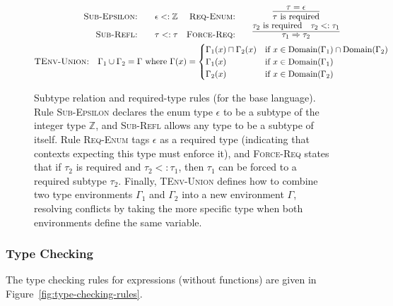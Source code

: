 \documentclass[peerreview, 10pt]{IEEEtran}
\newcommand{\Z}{\ensuremath{\mathbb{Z}}}
\newcommand{\required}[1]{\ensuremath{#1\text{ is required}}}
\newcommand{\forcerequire}[2]{\ensuremath{#1\Rightarrow#2}}
\begin{document}
\begin{figure}[ht]
\centering
\begin{framed}
    \[
\begin{gathered}
\begin{array}{rcrc}
\text{\textsc{Sub-Epsilon:}} &\quad \epsilon <: \Z &
\text{\textsc{Req-Enum:}} &\quad \infer{\required{\tau}}{\tau = \epsilon} \\
\text{\textsc{Sub-Refl:}} &\quad \tau <: \tau &
\text{\textsc{Force-Req:}} &\quad \infer{\forcerequire{\tau_1}{\tau_2}}{\required{\tau_2}\quad \tau_2 <: \tau_1}
\end{array}\\
\text{\textsc{TEnv-Union:}} \quad \Gamma_1 \cup \Gamma_2=\Gamma \text{ where } \Gamma(x)=
\begin{cases}
    \Gamma_1(x)\sqcap\Gamma_2(x) & \text{if } x \in \text{Domain}(\Gamma_1) \cap \text{Domain}(\Gamma_2)\\
    \Gamma_1(x) & \text{if } x \in \text{Domain}(\Gamma_1) \\
    \Gamma_2(x) & \text{if } x \in \text{Domain}(\Gamma_2) 
\end{cases}
\end{gathered}
    \]
\end{framed}
\caption{Subtype relation and required-type rules (for the base language). Rule \textsc{Sub-Epsilon} declares the enum type $\epsilon$ to be a subtype of the integer type $\Z$, and \textsc{Sub-Refl} allows any type to be a subtype of itself. Rule \textsc{Req-Enum} tags $\epsilon$ as a required type (indicating that contexts expecting this type must enforce it), and \textsc{Force-Req} states that if $\tau_2$ is required and $\tau_2 <: \tau_1$, then $\tau_1$ can be forced to a required subtype $\tau_2$. 
Finally, \textsc{TEnv-Union} defines how to combine two type environments $\Gamma_1$ and $\Gamma_2$ into a new environment $\Gamma$, resolving conflicts by taking the more specific type when both environments define the same variable.}
\label{fig:subtype-required-rules}
\end{figure}

\subsubsection{Type Checking}
The type checking rules for expressions (without functions) are given in Figure~\ref{fig:type-checking-rules}.
\end{document}
